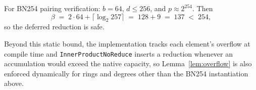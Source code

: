 \begin{corollary}\label{cor:overflow-bn254}
For BN254 pairing verification: $b=64$, $d \leq 256$, and $p \approx 2^{254}$.
Then
\[
  \beta \;=\; 2 \cdot 64 + \lceil\log_2 257\rceil \;=\; 128 + 9 \;=\; 137 \;<\; 254,
\]
so the deferred reduction is safe.
\end{corollary}

Beyond this static bound, the implementation tracks each element's overflow at
compile time and \texttt{InnerProductNoReduce} inserts a reduction whenever an
accumulation would exceed the native capacity, so Lemma~\ref{lem:overflow} is
also enforced dynamically for rings and degrees other than the BN254
instantiation above.